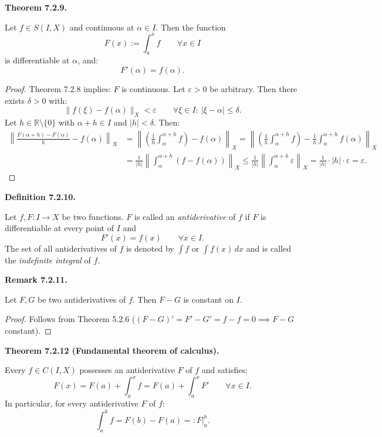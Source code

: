 \documentclass[12pt]{article}
\newenvironment{satz}[1]{%
  \par\vspace{6pt}\noindent\textbf{Theorem #1.}\itshape\space
}{%
  \par\vspace{6pt}
}
\newenvironment{definition}[1]{%
  \par\vspace{6pt}\noindent\textbf{Definition #1.}\itshape\space
}{%
  \par\vspace{6pt}
}
\newenvironment{bemerkung}[1]{%
  \par\vspace{6pt}\noindent\textbf{Remark #1.}\itshape\space
}{%
  \par\vspace{6pt}
}
\begin{document}
\begin{satz}{7.2.9}
Let $f\in S(I,X)$ and continuous at $\alpha\in I$. Then the function
\[
F(x):=\int_a^x f\qquad\forall x\in I
\]
is differentiable at $\alpha$, and:
\[
F'(\alpha)=f(\alpha).
\]
\end{satz}

\begin{proof}
Theorem 7.2.8 implies: $F$ is continuous. Let $\varepsilon>0$ be arbitrary. Then there exists $\delta>0$ with:
\[
\|f(\xi)-f(\alpha)\|_X<\varepsilon\qquad\forall\xi\in I:\ |\xi-\alpha|\le\delta.
\]
Let $h\in\mathbb R\setminus\{0\}$ with $\alpha+h\in I$ and $|h|<\delta$. Then:
\begin{align*}
\left\|\frac{F(\alpha+h)-F(\alpha)}{h}-f(\alpha)\right\|_X
&=\left\|\left(\frac{1}{h}\int_\alpha^{\alpha+h}f\right)-f(\alpha)\right\|_X
=\left\|\left(\frac{1}{h}\int_\alpha^{\alpha+h}f\right)-\frac{1}{h}\int_\alpha^{\alpha+h}f(\alpha)\right\|_X\\
&=\frac{1}{|h|}\left\|\int_\alpha^{\alpha+h}(f-f(\alpha))\right\|_X
\le\frac{1}{|h|}\left\|\int_\alpha^{\alpha+h}\varepsilon\right\|_X
=\frac{1}{|h|}\cdot|h|\cdot\varepsilon=\varepsilon.
\end{align*}
\end{proof}

\begin{definition}{7.2.10}
Let $f,F:I\to X$ be two functions. $F$ is called an \emph{antiderivative} of $f$ if
$F$ is differentiable at every point of $I$ and
\[
F'(x)=f(x)\qquad\forall x\in I.
\]
The set of all antiderivatives of $f$ is denoted by $\int f$ or $\int f(x)\,dx$ and is called the
\emph{indefinite integral} of $f$.
\end{definition}

\begin{bemerkung}{7.2.11}
Let $F,G$ be two antiderivatives of $f$. Then $F-G$ is constant on $I$.
\end{bemerkung}

\begin{proof}
Follows from Theorem 5.2.6 ($(F-G)'=F'-G'=f-f=0\implies F-G$ constant). \qedhere
\end{proof}

\begin{satz}{7.2.12 (Fundamental theorem of calculus)}
Every $f\in C(I,X)$ possesses an antiderivative $F$ of $f$ and satisfies:
\[
F(x)=F(a)+\int_a^x f=F(a)+\int_a^x F'
\qquad\forall x\in I.
\]
In particular, for every antiderivative $F$ of $f$:
\[
\int_a^b f=F(b)-F(a)=:F\big|_a^b.
\]
\end{satz}
\end{document}
